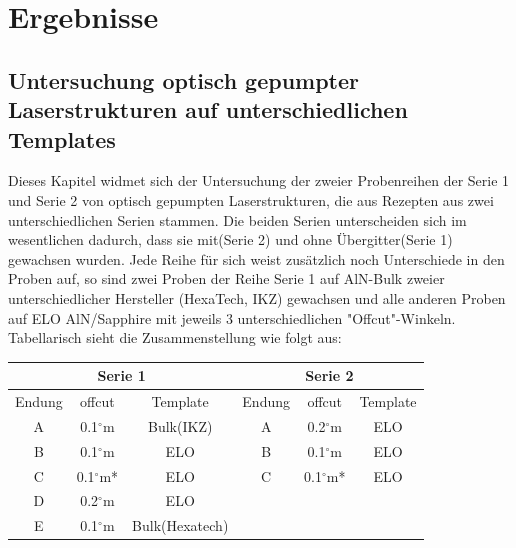 \chapter{Ergebnisse}
\thispagestyle{fancy}
\section{Untersuchung optisch gepumpter Laserstrukturen auf unterschiedlichen Templates}




Dieses Kapitel widmet sich der Untersuchung der zweier Probenreihen der Serie 1 und Serie 2 von optisch gepumpten Laserstrukturen, die aus Rezepten aus zwei unterschiedlichen Serien stammen. Die beiden Serien unterscheiden sich im wesentlichen dadurch, dass sie mit(Serie 2) und ohne Übergitter(Serie 1) gewachsen wurden. Jede Reihe für sich weist  zusätzlich noch Unterschiede in den Proben auf, so sind zwei Proben der Reihe Serie 1 auf AlN-Bulk zweier unterschiedlicher Hersteller (HexaTech, IKZ) gewachsen und alle anderen Proben auf ELO AlN/Sapphire mit jeweils 3 unterschiedlichen "Offcut"-Winkeln. Tabellarisch sieht die Zusammenstellung wie folgt aus: 

\vspace{1cm}


\setlength{\arrayrulewidth}{0.1mm}
\setlength{\tabcolsep}{4.5mm}
\renewcommand{\arraystretch}{1.5}
 
\centering
\begin{tabular}{ |c|c|c|c|c|c|   }
\hline
\multicolumn{3}{|c|}{Serie 1} & \multicolumn{3}{c|}{Serie 2}  \\
\hline
Endung & offcut& Template & Endung & offcut & Template \\
\hline
A & 0.1$^\circ$m & Bulk(IKZ) &A & 0.2$^\circ$m & ELO \\
B & 0.1$^\circ$m & ELO & B & 0.1$^\circ$m & ELO \\
C & 0.1$^\circ$m* & ELO & C & 0.1$^\circ$m* & ELO \\
D & 0.2$^\circ$m & ELO &  & &  \\
E & 0.1$^\circ$m & Bulk(Hexatech) & & & \\
\hline
\end{tabular}
\newpage




